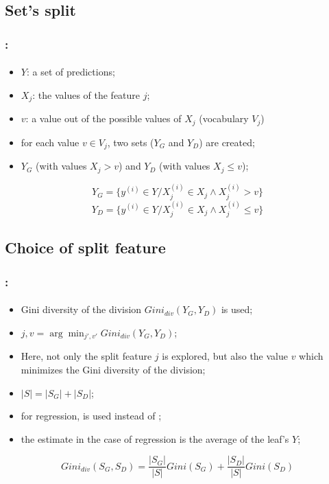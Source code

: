 \documentclass[xcolor=table]{beamer}
\begin{document}
\subsection{Set's split}

\begin{frame}
	\frametitle{\insertshortsubtitle: \insertsection}
	\framesubtitle{\insertsubsection}
	
	\begin{itemize}
		\item $Y$: a set of predictions;
		\item $X_j$: the values of the feature $j$;
		\item $v$: a value out of the possible values of $X_j$ (vocabulary $V_j$)
		\item for each value $v \in V_j$, two sets ($Y_G$ and $Y_D$) are created;
		\item $Y_G$ (with values $X_j > v$) and $Y_D$ (with values $X_j \le v$);
	\end{itemize}
	
	\[Y_G = \{y^{(i)} \in Y / X_j^{(i)} \in X_j \wedge X_j^{(i)} > v\}\]
	\[Y_D = \{y^{(i)} \in Y / X_j^{(i)} \in X_j \wedge X_j^{(i)} \le v\}\]
	
\end{frame}

\subsection{Choice of split feature}

\begin{frame}
	\frametitle{\insertshortsubtitle: \insertsection}
	\framesubtitle{\insertsubsection}
	
	\begin{itemize}
		\item Gini diversity of the division $Gini_{div}(Y_G, Y_D)$ is used;
		\item $j, v = \arg\min_{j', v'} Gini_{div}(Y_G, Y_D)$;
		\item Here, not only the split feature $j$ is explored, but also the value $v$ which minimizes the Gini diversity of the division;
		\item $|S| = |S_G| + |S_D|$;
		\item for regression,  is used instead of ;
		\item the estimate in the case of regression is the average of the leaf's $Y$;
	\end{itemize}
	
	\[Gini_{div}(S_G, S_D) = \frac{|S_G|}{|S|} Gini(S_G) + \frac{|S_D|}{|S|} Gini(S_D)\]
	
	
\end{frame}
\end{document}

